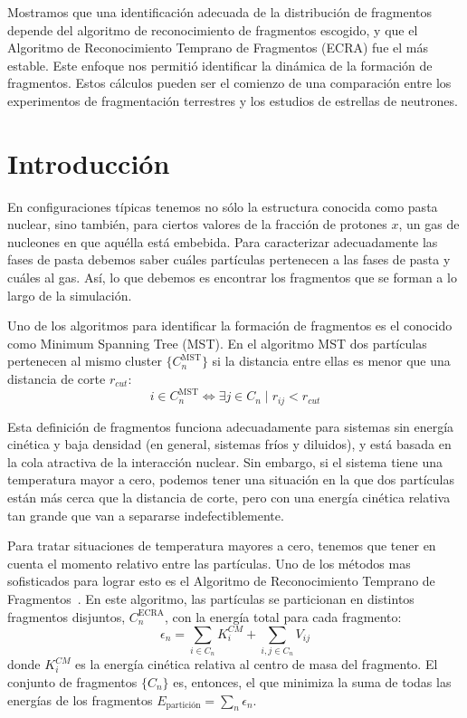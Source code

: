 Mostramos que una identificación adecuada de la distribución de fragmentos depende del algoritmo de reconocimiento de fragmentos escogido, y que el Algoritmo de Reconocimiento Temprano de Fragmentos (ECRA) fue el más estable.
Este enfoque nos permitió identificar la dinámica de la formación de fragmentos.
Estos cálculos pueden ser el comienzo de una comparación entre los experimentos de fragmentación terrestres y los estudios de estrellas de neutrones.

\section{Introducción}
En configuraciones típicas tenemos no sólo la estructura conocida como pasta nuclear, sino también, para ciertos valores de la fracción de protones $x$, un gas de nucleones en que aquélla está embebida.
Para caracterizar adecuadamente las fases de pasta debemos saber cuáles partículas pertenecen a las fases de pasta y cuáles al gas.
Así, lo que debemos es encontrar los fragmentos que se forman a lo largo de la simulación.

Uno de los algoritmos para identificar la formación de fragmentos es el conocido como Minimum Spanning Tree (MST).
En el algoritmo MST dos partículas pertenecen al mismo cluster $\{C^{\text{MST}}_n\}$ si la distancia entre ellas es menor que una distancia de corte $r_{cut}$:
\begin{equation*}
  i \in C^{\text{MST}}_n \Leftrightarrow \exists j \in C_n \mid
  r_{ij} < r_{cut}
\end{equation*}

Esta definición de fragmentos funciona adecuadamente para sistemas sin energía cinética y baja densidad (en general, sistemas fríos y diluidos), y está basada en la cola atractiva de la interacción nuclear.
Sin embargo, si el sistema tiene una temperatura mayor a cero, podemos tener una situación en la que dos partículas están más cerca que la distancia de corte, pero con una energía cinética relativa tan grande que van a separarse indefectiblemente.

Para tratar situaciones de temperatura mayores a cero, tenemos que tener en cuenta el momento relativo entre las partículas.
Uno de los métodos mas sofisticados para lograr esto es el Algoritmo de Reconocimiento Temprano de Fragmentos~\cite{dorso_early_1993}.
En este algoritmo, las partículas se particionan en distintos fragmentos disjuntos, $C^{\text{ECRA}}_n$, con la energía total para cada fragmento:
\begin{equation*}
  \epsilon_n = \sum_{i \in C_n} K^{CM}_i +  \sum_{i,j \in C_n} V_{ij}
\end{equation*}
donde $K^{CM}_i$ es la energía cinética relativa al centro de masa del fragmento.
El conjunto de fragmentos $\{C_n\}$ es, entonces, el que minimiza la suma de todas las energías de los fragmentos $E_{\text{partición}} =
\sum_n \epsilon_n$.

